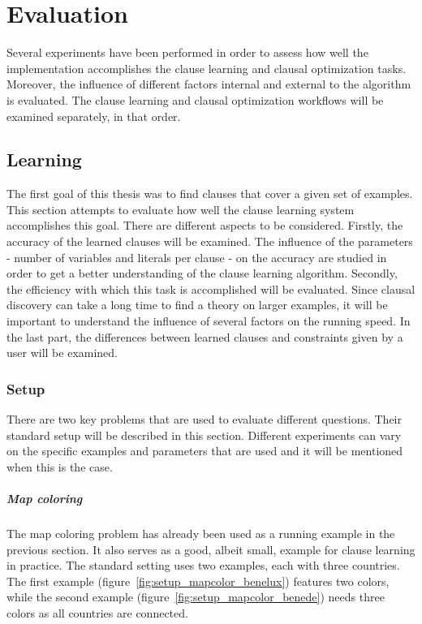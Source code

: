 \chapter{Evaluation}
\label{cha:evaluation}

Several experiments have been performed in order to assess how well the implementation accomplishes the clause learning and clausal optimization tasks.
Moreover, the influence of different factors internal and external to the algorithm is evaluated.
The clause learning and clausal optimization workflows will be examined separately, in that order.

\section{Learning}
The first goal of this thesis was to find clauses that cover a given set of examples.
This section attempts to evaluate how well the clause learning system accomplishes this goal.
There are different aspects to be considered.
Firstly, the accuracy of the learned clauses will be examined.
The influence of the parameters - number of variables and literals per clause - on the accuracy are studied in order to get a better understanding of the clause learning algorithm.
Secondly, the efficiency with which this task is accomplished will be evaluated.
Since clausal discovery can take a long time to find a theory on larger examples, it will be important to understand the influence of several factors on the running speed.
In the last part, the differences between learned clauses and constraints given by a user will be examined.

\subsection{Setup}
There are two key problems that are used to evaluate different questions.
Their standard setup will be described in this section.
Different experiments can vary on the specific examples and parameters that are used and it will be mentioned when this is the case.

\paragraph{Map coloring}
The map coloring problem has already been used as a running example in the previous section.
It also serves as a good, albeit small, example for clause learning in practice.
The standard setting uses two examples, each with three countries.
The first example (figure~\ref{fig:setup_mapcolor_benelux}) features two colors, while the second example (figure~\ref{fig:setup_mapcolor_benede}) needs three colors as all countries are connected.

